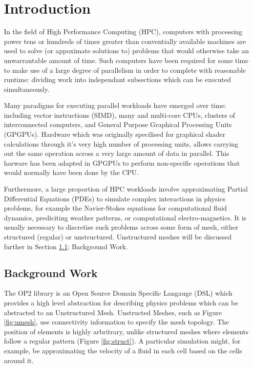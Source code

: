 
\section{Introduction}

In the field of High Performance Computing (HPC), computers with processing power tens or hundreds of times greater than conventially available machines are used to solve (or appoximate solutions to) problems that would otherwise take an unwarrantable amount of time. Such computers have been required for some time to make use of a large degree of parallelism in order to complete with reasonable runtime: dividing work into independant subsections which can be executed simultaneously.
\par Many paradigms for executing parallel workloads have emerged over time: including vector instructions (SIMD), many and multi-core CPUs, clusters of interconnected computers, and General Purpose Graphical Processing Units (GPGPUs). Hardware which was originally specilised for graphical shader calculations through it's very high number of processing units, allows carrying out the same operation across a very large amount of data in parallel. This harware has been adapted in GPGPUs to perform non-specific operations that would normally have been done by the CPU.
\par Furthermore, a large proportion of HPC workloads involve approximating Partial Differential Equations (PDEs) to simulate complex interactions in physics problems, for example the Navier-Stokes equations for computational fluid dynamics, prediciting weather patterns, or computational electro-magnetics. It is usually necessary to discretise such problems across some form of mesh, either structured (regular) or unstructured. Unstructured meshes will be discussed further in Section \ref{sec:bgwork}: Background Work.

\subsection{Background Work}
\label{sec:bgwork}
The OP2 library is an Open Source Domain Specific Langauge (DSL) which provides a high level abstraction for describing physics problems which can be abstracted to an Unstructured Mesh. Unstructed Meshes, such as Figure \ref{fig:umesh}, use connectivity information to specify the mesh topology. The position of elements is highly arbritrary, unlike structured meshes where elements follow a regular pattern (Figure \ref{fig:struct}). A particular simulation might, for example, be approximating the velocity of a fluid in each cell based on the cells around it.

